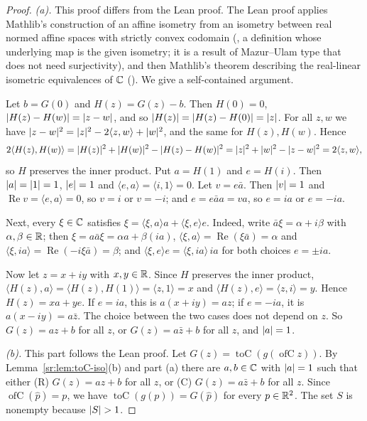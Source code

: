 \begin{proof}
\emph{(a).} This proof differs from the Lean proof. The Lean proof applies Mathlib's construction of an affine isometry
from an isometry between real normed affine spaces with strictly convex codomain
(, a definition whose underlying map is the given isometry; it is a
result of Mazur--Ulam type that does not need surjectivity), and then Mathlib's theorem describing the real-linear
isometric equivalences of $\mathbb C$ (). We give a self-contained argument.

Let $b=G(0)$ and $H(z)=G(z)-b$. Then $H(0)=0$, $\lvert H(z)-H(w)\rvert=\lvert z-w\rvert$, and so $\lvert H(z)\rvert=\lvert H(z)-H(0)\rvert=\lvert z\rvert$.
For all $z,w$ we have $\lvert z-w\rvert^2=\lvert z\rvert^2-2\langle z,w\rangle+\lvert w\rvert^2$, and the same for $H(z),H(w)$. Hence
\[
2\langle H(z),H(w)\rangle=\lvert H(z)\rvert^2+\lvert H(w)\rvert^2-\lvert H(z)-H(w)\rvert^2=\lvert z\rvert^2+\lvert w\rvert^2-\lvert z-w\rvert^2=2\langle z,w\rangle,
\]
so $H$ preserves the inner product. Put $a=H(1)$ and $e=H(i)$. Then $\lvert a\rvert=\lvert1\rvert=1$, $\lvert e\rvert=1$ and $\langle
e,a\rangle=\langle i,1\rangle=0$. Let $v=e\bar a$. Then $\lvert v\rvert=1$ and $\operatorname{Re}v=\langle e,a\rangle=0$, so
$v=i$ or $v=-i$; and $e=e\bar a a=va$, so $e=ia$ or $e=-ia$.

Next, every $\xi\in\mathbb C$ satisfies $\xi=\langle\xi,a\rangle a+\langle\xi,e\rangle e$. Indeed, write $\bar a\xi=\alpha+i\beta$
with $\alpha,\beta\in\mathbb R$; then $\xi=a\bar a\xi=\alpha a+\beta(ia)$, $\langle\xi,a\rangle=\operatorname{Re}(\xi\bar a)=\alpha$
and $\langle\xi,ia\rangle=\operatorname{Re}(-i\xi\bar a)=\beta$; and $\langle\xi,e\rangle e=\langle\xi,ia\rangle\,ia$ for
both choices $e=\pm ia$.

Now let $z=x+iy$ with $x,y\in\mathbb R$. Since $H$ preserves the inner product, $\langle H(z),a\rangle=\langle
H(z),H(1)\rangle=\langle z,1\rangle=x$ and $\langle H(z),e\rangle=\langle z,i\rangle=y$. Hence $H(z)=xa+ye$. If $e=ia$,
this is $a(x+iy)=az$; if $e=-ia$, it is $a(x-iy)=a\bar z$. The choice between the two cases does not depend on $z$. So
$G(z)=az+b$ for all $z$, or $G(z)=a\bar z+b$ for all $z$, and $\lvert a\rvert=1$.

\emph{(b).} This part follows the Lean proof. Let $G(z)=\operatorname{toC}(g(\operatorname{ofC}z))$. By
Lemma~\ref{sr:lem:toC-iso}(b) and part (a) there are $a,b\in\mathbb C$ with $\lvert a\rvert=1$ such that either
\textup{(R)} $G(z)=az+b$ for all $z$, or \textup{(C)} $G(z)=a\bar z+b$ for all $z$. Since $\operatorname{ofC}(\hat
p)=p$, we have $\operatorname{toC}(g(p))=G(\hat p)$ for every $p\in\mathbb R^2$. The set $S$ is nonempty because $\lvert S\rvert>1$.


\end{proof}
